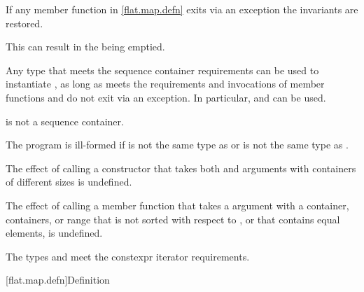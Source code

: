 \pnum
If any member function in \ref{flat.map.defn} exits via an exception
the invariants are restored.
\begin{note}
This can result in the  being emptied.
\end{note}

\pnum
Any type 
that meets the sequence container requirements
can be used to instantiate ,
as long as
 meets the  requirements and
invocations of
member functions  and  do not exit via an exception.
In particular,  and 
can be used.
\begin{note}
 is not a sequence container.
\end{note}

\pnum
The program is ill-formed if
 is not the same type as  or
 is not the same type as .

\pnum
The effect of calling a constructor
that takes
both  and  arguments with
containers of different sizes is undefined.

\pnum
The effect of calling a member function
that takes a  argument with
a container, containers, or range
that is not sorted with respect to , or
that contains equal elements,
is undefined.

\pnum
The types  and  meet
the constexpr iterator requirements.

[flat.map.defn]{Definition}

